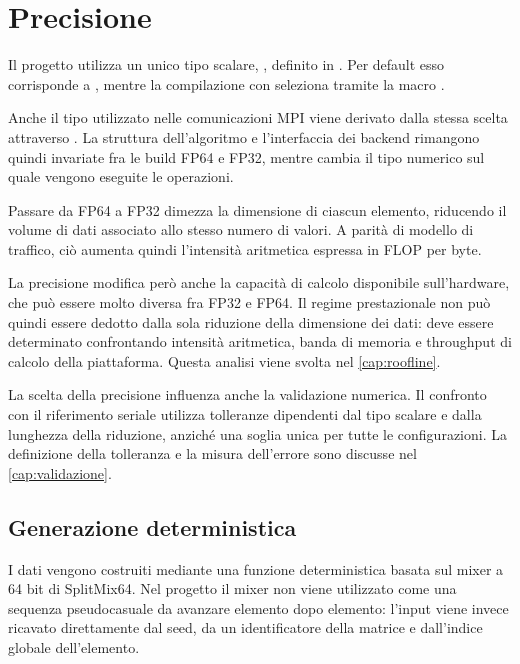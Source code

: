 
\section{Precisione}\label{sec:precisione}

Il progetto utilizza un unico tipo scalare, , definito in
. Per default esso corrisponde a ,
mentre la compilazione con  seleziona  tramite
la macro .

Anche il tipo utilizzato nelle comunicazioni MPI viene derivato dalla stessa
scelta attraverso . La struttura dell'algoritmo e
l'interfaccia dei backend rimangono quindi invariate fra le build FP64 e
FP32, mentre cambia il tipo numerico sul quale vengono eseguite le
operazioni.

Passare da FP64 a FP32 dimezza la dimensione di ciascun elemento,
riducendo il volume di dati associato allo stesso numero di valori.
A parità di modello di traffico, ciò aumenta quindi l'intensità aritmetica
espressa in FLOP per byte.

\color{red}
La precisione modifica però anche la capacità di calcolo disponibile
sull'hardware, che può essere molto diversa fra FP32 e FP64. Il regime
prestazionale non può quindi essere dedotto dalla sola riduzione della
dimensione dei dati: deve essere determinato confrontando intensità
aritmetica, banda di memoria e throughput di calcolo della piattaforma.
Questa analisi viene svolta nel \cref{cap:roofline}.

La scelta della precisione influenza anche la validazione numerica.
Il confronto con il riferimento seriale utilizza tolleranze dipendenti dal
tipo scalare e dalla lunghezza della riduzione, anziché una soglia unica
per tutte le configurazioni. La definizione della tolleranza e la misura
dell'errore sono discusse nel \cref{cap:validazione}.
\color{black}

\subsection{Generazione deterministica}

I dati vengono costruiti mediante una funzione deterministica basata sul
mixer a 64 bit di SplitMix64. Nel progetto il mixer non viene utilizzato
come una sequenza pseudocasuale da avanzare elemento dopo elemento:
l'input viene invece ricavato direttamente dal seed, da un identificatore
della matrice e dall'indice globale dell'elemento.

